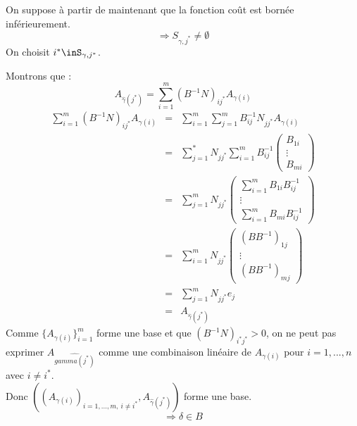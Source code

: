 On suppose à partir de maintenant que la fonction coût est bornée inférieurement.
	\[\Rightarrow S_{\gamma,j^*}\neq \emptyset\]
On choisit $i^*\inS_{\gamma,j^*}$.


\begin{dem}
Montrons que :
	\[A_{\hat{\gamma}(j^*)}=\sum_{i=1}^m (B^{-1}N)_{ij^*}A_{\gamma(i)}\]
\begin{eqnarray*}
	\sum_{i=1}^m (B^{-1}N)_{ij^*}A_{\gamma(i)}&=&\sum_{i=1}^m \sum_{j=1}^m B^{-1}_{ij}N_{jj^*}A_{\gamma(i)}\\
			&=&\sum_{j=1}^* N_{jj^*} \sum_{i=1}^m B^{-1}_{ij}\begin{pmatrix} B_{1i}\\ \vdots \\ B_{mi} \end{pmatrix} \\
			&=&\sum_{j=1}^m N_{jj^*} \begin{pmatrix} \sum_{i=1}^m B_{1i}B^{-1}_{ij} \\ \vdots \\ \sum_{i=1}^m B_{mi}B^{-1}_{ij} \end{pmatrix} \\
			&=&\sum_{i=1}^m N_{jj^*} \begin{pmatrix} (BB^{-1})_{1j} \\ \vdots \\ (BB^{-1})_{mj} \end{pmatrix}\\
			&=&\sum_{j=1}^m N_{jj^*}e_j \\
			&=&A_{\hat{\gamma}(j^*)}
\end{eqnarray*}
Comme $\{A_{\gamma(i)}\}_{i=1}^m$ forme une base et que $(B^{-1}N)_{i^*j^*}>0$, on ne peut pas exprimer $A_{\hat{gamma(j^*)}}$ comme une combinaison linéaire de $A_{\gamma(i)}$ pour $i=1,...,n$ avec $i\neq i^*$. \\
Donc $((A_{\gamma(i)})_{i=1,...,m,\ i\neq i^*},A_{\hat{\gamma}(j^*)})$ forme une base.
	\[\Rightarrow \delta \in B\]
\end{dem}

